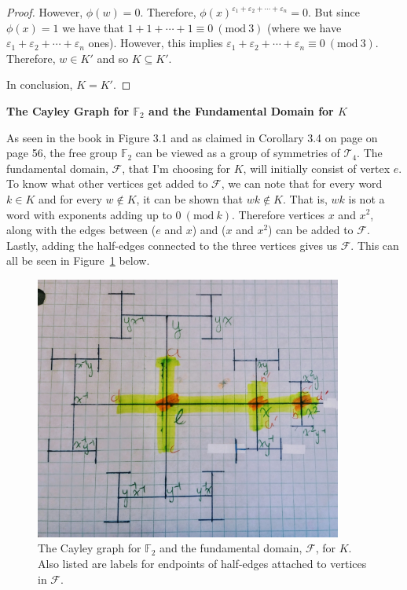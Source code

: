 \documentclass[12pt]{article}%
\newcommand{\F}{\mathbb{F}}
\newcommand{\Mod}[1]{\ (\mathrm{mod}\ #1)}
\begin{document}
\begin{proof}
However, $\phi(w)=0$. Therefore, $\phi(x)^{\varepsilon_1+\varepsilon_2+\cdots +\varepsilon_n}=0$. But
since $\phi(x)=1$ we have that $1+1+\cdots+1\equiv 0\Mod3$ (where we have
$\varepsilon_1+\varepsilon_2+\cdots +\varepsilon_n$ ones). However, this implies 
$\varepsilon_1+\varepsilon_2+\cdots +\varepsilon_n \equiv 0 \Mod{3}$. Therefore, $w\in K'$ and so 
$K\subseteq K'$.

In conclusion, $K=K'$.

\end{proof}

\textbf{The Cayley Graph for $\F_2$ and the Fundamental Domain for $K$}

As seen in the book in Figure 3.1 and as claimed in Corollary 3.4 on page on page 56, the free group
$\F_2$ can be viewed as a group of symmetries of $\mathcal{T}_4$. The fundamental domain, $\mathcal{F}$,
that I'm choosing for $K$, will initially consist of vertex $e$. To know what other vertices get added to
$\mathcal{F}$, we can note that for every word $k\in K$ and for every $w\not\in K$, it can be shown that
$wk\not\in K$. That is, $wk$ is not a word with exponents adding up to $0\Mod{k}$. Therefore vertices $x$
and $x^2$, along with the edges between ($e$ and $x$) and ($x$ and $x^2$) can be added to $\mathcal{F}$.
Lastly, adding the half-edges connected to the three vertices gives us $\mathcal{F}$. This can all be seen
in Figure~\ref{fig:fun_domain_of_K} below.

\begin{figure}[ht]
    \centering
    \includegraphics[width=0.9\textwidth]{images/fundamental_domain_for_K.jpg}
    \caption{The Cayley graph for $\F_2$ and the fundamental domain, $\mathcal{F}$, for $K$. Also listed are labels for endpoints of half-edges attached to vertices in $\mathcal{F}$.}
    \label{fig:fun_domain_of_K}
\end{figure}
\end{document}
